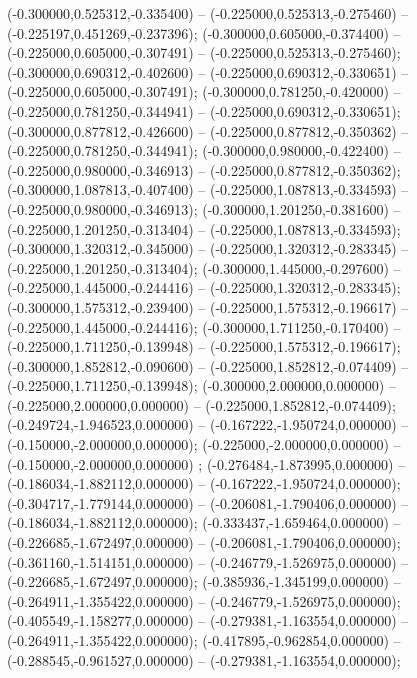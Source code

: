  (-0.300000,0.525312,-0.335400) -- (-0.225000,0.525313,-0.275460) -- (-0.225197,0.451269,-0.237396);
 (-0.300000,0.605000,-0.374400) -- (-0.225000,0.605000,-0.307491) -- (-0.225000,0.525313,-0.275460);
 (-0.300000,0.690312,-0.402600) -- (-0.225000,0.690312,-0.330651) -- (-0.225000,0.605000,-0.307491);
 (-0.300000,0.781250,-0.420000) -- (-0.225000,0.781250,-0.344941) -- (-0.225000,0.690312,-0.330651);
 (-0.300000,0.877812,-0.426600) -- (-0.225000,0.877812,-0.350362) -- (-0.225000,0.781250,-0.344941);
 (-0.300000,0.980000,-0.422400) -- (-0.225000,0.980000,-0.346913) -- (-0.225000,0.877812,-0.350362);
 (-0.300000,1.087813,-0.407400) -- (-0.225000,1.087813,-0.334593) -- (-0.225000,0.980000,-0.346913);
 (-0.300000,1.201250,-0.381600) -- (-0.225000,1.201250,-0.313404) -- (-0.225000,1.087813,-0.334593);
 (-0.300000,1.320312,-0.345000) -- (-0.225000,1.320312,-0.283345) -- (-0.225000,1.201250,-0.313404);
 (-0.300000,1.445000,-0.297600) -- (-0.225000,1.445000,-0.244416) -- (-0.225000,1.320312,-0.283345);
 (-0.300000,1.575312,-0.239400) -- (-0.225000,1.575312,-0.196617) -- (-0.225000,1.445000,-0.244416);
 (-0.300000,1.711250,-0.170400) -- (-0.225000,1.711250,-0.139948) -- (-0.225000,1.575312,-0.196617);
 (-0.300000,1.852812,-0.090600) -- (-0.225000,1.852812,-0.074409) -- (-0.225000,1.711250,-0.139948);
 (-0.300000,2.000000,0.000000) -- (-0.225000,2.000000,0.000000) -- (-0.225000,1.852812,-0.074409);
 (-0.249724,-1.946523,0.000000) -- (-0.167222,-1.950724,0.000000) -- (-0.150000,-2.000000,0.000000);
 (-0.225000,-2.000000,0.000000) -- (-0.150000,-2.000000,0.000000) ;
 (-0.276484,-1.873995,0.000000) -- (-0.186034,-1.882112,0.000000) -- (-0.167222,-1.950724,0.000000);
 (-0.304717,-1.779144,0.000000) -- (-0.206081,-1.790406,0.000000) -- (-0.186034,-1.882112,0.000000);
 (-0.333437,-1.659464,0.000000) -- (-0.226685,-1.672497,0.000000) -- (-0.206081,-1.790406,0.000000);
 (-0.361160,-1.514151,0.000000) -- (-0.246779,-1.526975,0.000000) -- (-0.226685,-1.672497,0.000000);
 (-0.385936,-1.345199,0.000000) -- (-0.264911,-1.355422,0.000000) -- (-0.246779,-1.526975,0.000000);
 (-0.405549,-1.158277,0.000000) -- (-0.279381,-1.163554,0.000000) -- (-0.264911,-1.355422,0.000000);
 (-0.417895,-0.962854,0.000000) -- (-0.288545,-0.961527,0.000000) -- (-0.279381,-1.163554,0.000000);
